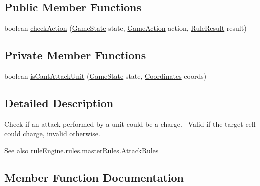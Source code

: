 \subsection*{Public Member Functions}
\begin{DoxyCompactItemize}
\item 
boolean \mbox{\hyperlink{classrule_engine_1_1rules_1_1atomic_rules_1_1_check_is_charge_a6458591e4a67fc19c5ea490b5da954d3}{check\+Action}} (\mbox{\hyperlink{classgame_1_1game_state_1_1_game_state}{Game\+State}} state, \mbox{\hyperlink{classrule_engine_1_1_game_action}{Game\+Action}} action, \mbox{\hyperlink{classrule_engine_1_1_rule_result}{Rule\+Result}} result)
\end{DoxyCompactItemize}
\subsection*{Private Member Functions}
\begin{DoxyCompactItemize}
\item 
boolean \mbox{\hyperlink{classrule_engine_1_1rules_1_1atomic_rules_1_1_check_is_charge_a268e5c048a137a32a882802bf494a7c6}{is\+Cant\+Attack\+Unit}} (\mbox{\hyperlink{classgame_1_1game_state_1_1_game_state}{Game\+State}} state, \mbox{\hyperlink{classrule_engine_1_1_coordinates}{Coordinates}} coords)
\end{DoxyCompactItemize}


\subsection{Detailed Description}
Check if an attack performed by a unit could be a charge.~\newline
 Valid if the target cell could charge, invalid otherwise.

\begin{DoxySeeAlso}{See also}
\mbox{\hyperlink{classrule_engine_1_1rules_1_1master_rules_1_1_attack_rules}{rule\+Engine.\+rules.\+master\+Rules.\+Attack\+Rules}} 
\end{DoxySeeAlso}


\subsection{Member Function Documentation}
\mbox{\label{classrule_engine_1_1rules_1_1atomic_rules_1_1_check_is_charge_a6458591e4a67fc19c5ea490b5da954d3}} 
